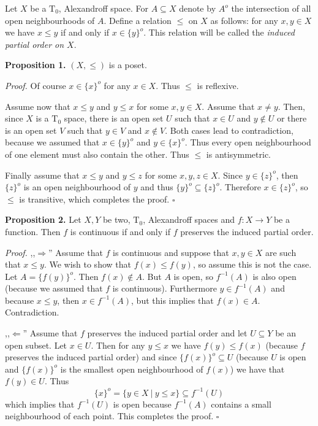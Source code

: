 \documentclass[12pt]{article}
\begin{document}
Let $X$ be a $\mathrm{T}_{0}$, Alexandroff space. For $A\subseteq X$ denote by $A^{o}$ the intersection of all open neighbourhoods of $A$. Define a relation $\leq$ on $X$ as follows: for any $x,y\in X$ we have $x\leq y$ if and only if $x\in\{y\}^{o}$. This relation will be called the \textit{induced partial order on $X$}.

\textbf{Proposition 1.} $(X,\leq)$ is a poset.

\textit{Proof.} Of course $x\in\{x\}^{o}$ for any $x\in X$. Thus $\leq$ is reflexive.

Assume now that $x\leq y$ and $y\leq x$ for some $x,y\in X$. Assume that $x\neq y$. Then, since $X$ is a $\mathrm{T}_{0}$ space, there is an open set $U$ such that $x\in U$ and $y\not\in U$ or there is an open set $V$ such that $y\in V$ and $x\not\in V$. Both cases lead to contradiction, because we assumed that $x\in\{y\}^{o}$ and $y\in\{x\}^{o}$. Thus every open neighbourhood of one element must also contain the other. Thus $\leq$ is antisymmetric.

Finally assume that $x\leq y$ and $y\leq z$ for some $x,y,z\in X$. Since $y\in\{z\}^{o}$, then $\{z\}^{o}$ is an open neighbourhood of $y$ and thus $\{y\}^{o}\subseteq\{z\}^{o}$. Therefore $x\in\{z\}^{o}$, so $\leq$ is transitive, which completes the proof. $\square$

\textbf{Proposition 2.} Let $X,Y$ be two, $\mathrm{T}_{0}$, Alexandroff spaces and $f:X\to Y$ be a function. Then $f$ is continuous if and only if $f$ preserves the induced partial order.

\textit{Proof.} ,,$\Rightarrow$'' Assume that $f$ is continuous and suppose that $x,y\in X$ are such that $x\leq y$. We wish to show that $f(x)\leq f(y)$, so assume this is not the case. Let $A=\{f(y)\}^{o}$. Then $f(x)\not\in A$. But $A$ is open, so $f^{-1}(A)$ is also open (because we assumed that $f$ is continuous). Furthermore $y\in f^{-1}(A)$ and because $x\leq y$, then $x\in f^{-1}(A)$, but this implies that $f(x)\in A$. Contradiction.

,,$\Leftarrow$'' Assume that $f$ preserves the induced partial order and let $U\subseteq Y$ be an open subset. Let $x\in U$. Then for any $y\leq x$ we have $f(y)\leq f(x)$ (because $f$ preserves the induced partial order) and since $\{f(x)\}^{o}\subseteq U$ (because $U$ is open and $\{f(x)\}^{o}$ is the smallest open neighbourhood of $f(x)$) we have that $f(y)\in U$. Thus $$\{x\}^{o}=\{y\in X\ |\ y\leq x\}\subseteq f^{-1}(U)$$
which implies that $f^{-1}(U)$ is open because $f^{-1}(A)$ contains a small neighbourhood of each point. This completes the proof. $\square$
\end{document}
